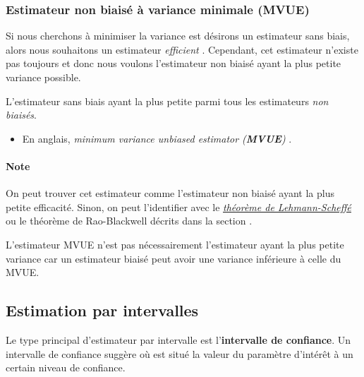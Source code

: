 \documentclass[french]{article}
\begin{document}
\begin{multicols*}{2}
\columnbreak
\subsubsection{Estimateur non biaisé à variance minimale (MVUE)} \label{subsubsec:MVUECriteria}
\begin{rappel_enhanced}[Motivation]
Si nous cherchons à minimiser la variance est désirons un estimateur sans biais, alors nous souhaitons un estimateur \og \textit{efficient} \fg{}. Cependant, cet estimateur n'existe pas toujours et donc nous voulons l'estimateur non biaisé ayant la plus petite variance possible.
\end{rappel_enhanced}

\begin{definitionNOHFILL}
L'estimateur sans biais ayant la plus petite parmi tous les estimateurs \textit{non biaisés}.

\begin{itemize}
	\item	En anglais, \og \textit{minimum variance unbiased estimator (\textbf{MVUE})} \fg{}.
\end{itemize}
\end{definitionNOHFILL}

\paragraph{Note}	On peut trouver cet estimateur comme l'estimateur non biaisé ayant la plus petite efficacité. Sinon, on peut l'identifier avec le \underline{\textit{\hyperlink{lehSchTh}{théorème de Lehmann-Scheffé}}} ou le théorème de Rao-Blackwell décrits dans la section \underline{\textit{}}.

\bigskip

\begin{rappel_enhanced}[Limitations]
L'estimateur MVUE n'est pas nécessairement l'estimateur ayant la plus petite variance car un estimateur biaisé peut avoir une variance inférieure à celle du MVUE.
\end{rappel_enhanced}





\columnbreak
\subsection{Estimation par intervalles}\label{sec:int-estimation}
\begin{rappel_enhanced}[Contexte]
Le type principal d'estimateur par intervalle est l'\textbf{intervalle de confiance}. Un intervalle de confiance suggère où est situé la valeur du paramètre d'intérêt à un certain niveau de confiance. 


\end{rappel_enhanced}
\end{multicols*}
\end{document}
